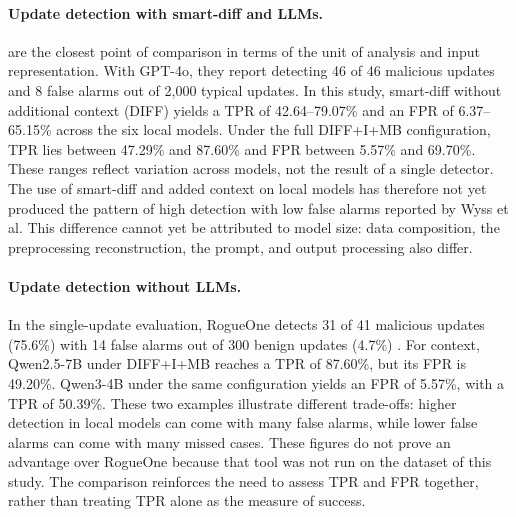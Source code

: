 \documentclass[a4paper,fleqn]{cas-dc}
\begin{document}
\paragraph{Update detection with smart-diff and LLMs.}
\citet{wyss2025evaluating} are the closest point of comparison in terms of the
unit of analysis and input representation. With GPT-4o, they report detecting 46
of 46 malicious updates and 8 false alarms out of 2,000 typical updates. In this
study, smart-diff without additional context (DIFF) yields a TPR of
42.64--79.07\% and an FPR of 6.37--65.15\% across the six local models. Under the
full DIFF+I+MB configuration, TPR lies between 47.29\% and 87.60\% and FPR between
5.57\% and 69.70\%. These ranges reflect variation across models, not the result
of a single detector. The use of smart-diff and added context on local models has
therefore not yet produced the pattern of high detection with low false alarms
reported by Wyss et al. This difference cannot yet be attributed to model size:
data composition, the preprocessing reconstruction, the prompt, and output
processing also differ.

\paragraph{Update detection without LLMs.}
In the single-update evaluation, RogueOne detects 31 of 41 malicious updates
(75.6\%) with 14 false alarms out of 300 benign updates (4.7\%)
\citep{sofaer2024rogueone}. For context, Qwen2.5-7B under DIFF+I+MB reaches a TPR
of 87.60\%, but its FPR is 49.20\%. Qwen3-4B under the same configuration yields
an FPR of 5.57\%, with a TPR of 50.39\%. These two examples illustrate different
trade-offs: higher detection in local models can come with many false alarms,
while lower false alarms can come with many missed cases. These figures do not
prove an advantage over RogueOne because that tool was not run on the dataset of
this study. The comparison reinforces the need to assess TPR and FPR together,
rather than treating TPR alone as the measure of success.
\end{document}
